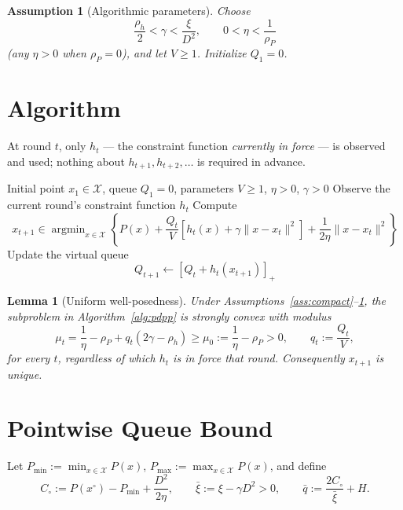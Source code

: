 \documentclass[10pt]{article}
\newtheorem{assumption}{Assumption}
\newtheorem{lemma}{Lemma}
\newcommand{\X}{\mathcal{X}}
\newcommand{\argmin}{\mathop{\mathrm{argmin}}}
\begin{document}
\begin{assumption}[Algorithmic parameters]
\label{ass:params}
Choose
\[
\frac{\rho_h}{2}<\gamma<\frac{\xi}{D^2},
\qquad
0<\eta<\frac1{\rho_P}
\]
(any $\eta>0$ when $\rho_P=0$), and let $V\geq1$. Initialize $Q_1=0$.
\end{assumption}

\section{Algorithm}
\label{sec:algorithm}

At round $t$, only $h_t$ --- the constraint function \emph{currently in
force} --- is observed and used; nothing about $h_{t+1}, h_{t+2},\ldots$
is required in advance.

\begin{algorithm}[h]
\caption{Proximal Drift-Plus-Penalty}
\label{alg:pdpp}
\begin{algorithmic}[1]
\Require Initial point $x_1\in\X$, queue $Q_1=0$, parameters $V\geq1$,
$\eta>0$, $\gamma>0$
    \State Observe the current round's constraint function $h_t$
    \State Compute
    \[
    x_{t+1}\in\argmin_{x\in\X}
    \left\{
    P(x)+\frac{Q_t}{V}\left[h_t(x)+\gamma\|x-x_t\|^2\right]
    +\frac1{2\eta}\|x-x_t\|^2
    \right\}
    \]
    \State Update the virtual queue
    \[
    Q_{t+1}\gets[Q_t+h_t(x_{t+1})]_+
    \]
\EndFor
\end{algorithmic}
\end{algorithm}

\begin{lemma}[Uniform well-posedness]
\label{lem:wellposed}
Under Assumptions~\ref{ass:compact}--\ref{ass:params}, the subproblem in
Algorithm~\ref{alg:pdpp} is strongly convex with modulus
\[
\mu_t=\frac1\eta-\rho_P+q_t(2\gamma-\rho_h)\geq\mu_0:=\frac1\eta-\rho_P>0,
\qquad q_t:=\frac{Q_t}{V},
\]
for every $t$, regardless of which $h_t$ is in force that round.
Consequently $x_{t+1}$ is unique.
\end{lemma}

\section{Pointwise Queue Bound}
\label{sec:guarantees}

Let $P_{\min}:=\min_{x\in\X}P(x)$, $P_{\max}:=\max_{x\in\X}P(x)$, and
define
\[
C_\circ:=P(x^{\circ})-P_{\min}+\frac{D^2}{2\eta},
\qquad
\bar\xi:=\xi-\gamma D^2>0,
\qquad
\bar q:=\frac{2C_\circ}{\bar\xi}+H.
\]
\end{document}
